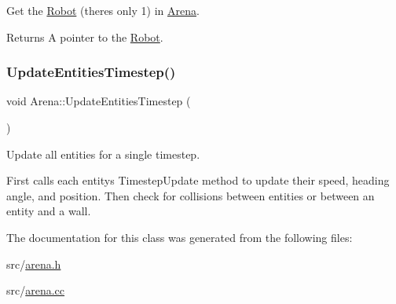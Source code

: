 Get the \mbox{\hyperlink{class_robot}{Robot}} (there\textquotesingle{}s only 1) in \mbox{\hyperlink{class_arena}{Arena}}. 

\begin{DoxyReturn}{Returns}
A pointer to the \mbox{\hyperlink{class_robot}{Robot}}. 
\end{DoxyReturn}
\mbox{\label{class_arena_a682ec81cb30e36e5bb801b3388bcb494}} 
\subsubsection{\texorpdfstring{Update\+Entities\+Timestep()}{UpdateEntitiesTimestep()}}
{\footnotesize\ttfamily void Arena\+::\+Update\+Entities\+Timestep (\begin{DoxyParamCaption}{ }\end{DoxyParamCaption})}



Update all entities for a single timestep. 

First calls each entity\textquotesingle{}s Timestep\+Update method to update their speed, heading angle, and position. Then check for collisions between entities or between an entity and a wall. 

The documentation for this class was generated from the following files\+:\begin{DoxyCompactItemize}
\item 
src/\mbox{\hyperlink{arena_8h}{arena.\+h}}\item 
src/\mbox{\hyperlink{arena_8cc}{arena.\+cc}}\end{DoxyCompactItemize}
